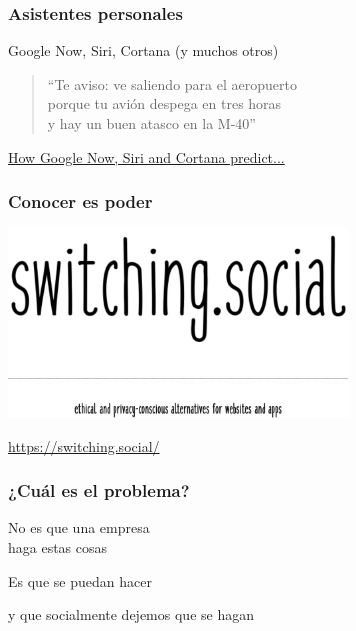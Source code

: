 \documentclass[17pt,aspectratio=169,hyperref=pdfusetitle]{beamer}
\begin{document}



\begin{frame}
\frametitle{Asistentes personales}

\begin{flushright}
  Google Now, Siri, Cortana (y muchos otros)
\end{flushright}

\begin{quote}
  ``Te aviso:
  ve saliendo para el aeropuerto \\
  porque tu avión despega en tres horas \\
  y hay un buen atasco en la M-40'' \\
\end{quote}


 {\small \href{http://searchengineland.com/how-google-now-siri-cortana-predict-what-you-want-229799}{How Google Now, Siri and Cortana predict...}}
\end{frame}



\begin{frame}[fragile]
  \frametitle{Conocer es poder}

  \begin{center}
  \includegraphics[width=9cm]{figs/switching-social}
  \end{center}

  \begin{flushright}
      \url{https://switching.social/} \\
  \end{flushright}

\end{frame}



\begin{frame}
\frametitle{¿Cuál es el problema?}

{\large
\begin{center}
No es que una empresa \\
haga estas cosas
\pause
\vspace{1cm}

Es que se puedan hacer
\pause
\vspace{1cm}

y que socialmente dejemos que se hagan
\end{center}
}
\end{frame}
\end{document}
